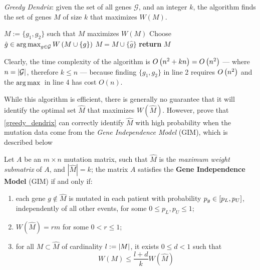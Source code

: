 \begin{algorithm}[H]
    \caption{
        \textit{Greedy Dendrix}: given the set of all genes $\mathcal G$, and an integer $k$, the algorithm finds the set of genes $M$ of size $k$ that maximizes $W(M)$.
    }

        \label{greedy_dendrix}
    \begin{algorithmic}[1]
            \State $M := \{g_1, g_2\}$ such that $M$ maximizes $W(M)$ 
                \State Choose $\hat g \in \operatorname*{arg\,max}_{g \in \mathcal G}{W \left(M \cup \{g\}\right)}$
                \State $M = M \cup \{\hat g\}$
            \EndFor
            \State \textbf{return} $M$
        \EndFunction
    \end{algorithmic}
\end{algorithm}

Clearly, the time complexity of the algorithm is $O\left(n^2 + kn\right) = O\left(n^2\right)$ --- where $n = \left|\mathcal G\right|$, therefore $k \le n$ --- because finding $\{g_1, g_2\}$ in line 2 requires $O\left(n^2\right)$ and the $\operatorname*{arg\,max}{}$ in line 4 has cost $O(n)$. 

While this algorithm is efficient, there is generally no guarantee that it will identify the optimal set $\hat M$ that maximizes $W(\hat M)$. However, \textcite{dendrix} prove that \cref{greedy_dendrix} can correctly identify $\hat M$ with high probability when the mutation data come from the \textit{Gene Independence Model} (GIM), which is described below

\begin{definition}
    Let $A$ be an $m \times n$ mutation matrix, such that $\hat M$ is the \textit{maximum weight submatrix} of $A$, and $|\hat M| = k$; the matrix $A$ satisfies the \textbf{Gene Independence Model} (GIM) if and only if:

    \begin{enumerate}[label=\roman*), font=\itshape]
        \item each gene $g \notin \hat M$ is mutated in each patient with probability $p_g \in \left[p_L, p_U\right]$, independently of all other events, for some $0 \le p_L, p_U \le 1$;
        \item $W (\hat M)= rm$ for some $0 < r \le 1$;
        \item for all $M \subset \hat M$ of cardinality $l := \left|M\right|$, it exists $0 \le d < 1$ such that $$W(M) \le \frac{l + d}{k} W(\hat M)$$
    \end{enumerate}
\end{definition}

